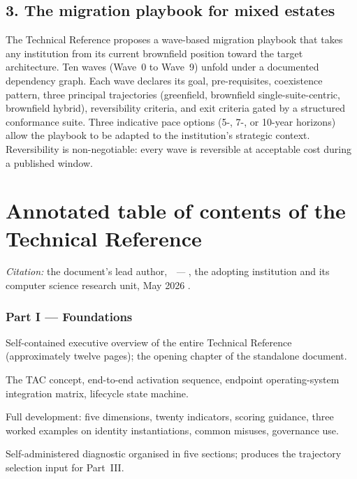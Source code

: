 \documentclass[11pt,a4paper,twoside]{book}
\begin{document}
\subsection*{3. The migration playbook for mixed estates}

The Technical Reference proposes a wave-based migration playbook
that takes any institution from its current brownfield position
toward the target architecture. Ten waves (Wave~0 to Wave~9)
unfold under a documented dependency graph. Each wave declares
its goal, pre-requisites, coexistence pattern, three principal
trajectories (greenfield, brownfield single-suite-centric, brownfield
hybrid), reversibility criteria, and exit criteria gated by a
structured conformance suite. Three indicative pace options
(5-, 7-, or 10-year horizons) allow the playbook to be adapted to
the institution's strategic context. Reversibility is
non-negotiable: every wave is reversible at acceptable cost
during a published window.

\section*{Annotated table of contents of the Technical Reference}

\noindent\emph{Citation:} the document's lead author, \emph{\suitsolutiontitle\
--- \suitsolutionsubtitle},
the adopting institution and its computer science research unit, May 2026
\cite{ng-tech-ref-2026}.

\medskip

\subsubsection*{Part I --- Foundations}

\begin{description}[leftmargin=4em,style=nextline,nosep,font=\bfseries]
  \item[Ch.~1\ \ Synthesis]
    Self-contained executive overview of the entire Technical
    Reference (approximately twelve pages); the opening chapter
    of the standalone document.
  \item[Ch.~2\ \ Conceptual frame]
    The TAC concept, end-to-end activation sequence, endpoint
    operating-system integration matrix, lifecycle state machine.
  \item[Ch.~3\ \ The sovereignty grid]
    Full development: five dimensions, twenty indicators, scoring
    guidance, three worked examples on identity instantiations,
    common misuses, governance use.
  \item[Ch.~4\ \ Institutional self-assessment]
    Self-administered diagnostic organised in five sections;
    produces the trajectory selection input for
    Part~III.
\end{description}
\end{document}
